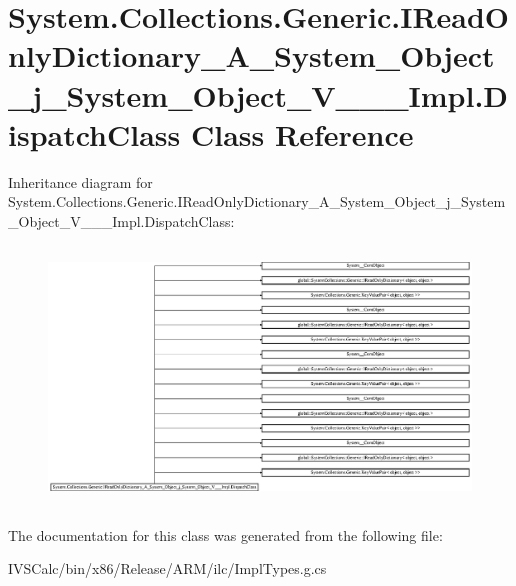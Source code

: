 \hypertarget{class_system_1_1_collections_1_1_generic_1_1_i_read_only_dictionary___a___system___object__j___s1aae0a57dbf34cb01a493fd2e37dd17e}{}\section{System.\+Collections.\+Generic.\+I\+Read\+Only\+Dictionary\+\_\+\+A\+\_\+\+System\+\_\+\+Object\+\_\+j\+\_\+\+System\+\_\+\+Object\+\_\+\+V\+\_\+\+\_\+\+\_\+\+Impl.\+Dispatch\+Class Class Reference}
\label{class_system_1_1_collections_1_1_generic_1_1_i_read_only_dictionary___a___system___object__j___s1aae0a57dbf34cb01a493fd2e37dd17e}
Inheritance diagram for System.\+Collections.\+Generic.\+I\+Read\+Only\+Dictionary\+\_\+\+A\+\_\+\+System\+\_\+\+Object\+\_\+j\+\_\+\+System\+\_\+\+Object\+\_\+\+V\+\_\+\+\_\+\+\_\+\+Impl.\+Dispatch\+Class\+:\begin{figure}[H]
\begin{center}
\leavevmode
\includegraphics[height=6.924266cm]{class_system_1_1_collections_1_1_generic_1_1_i_read_only_dictionary___a___system___object__j___s1aae0a57dbf34cb01a493fd2e37dd17e}
\end{center}
\end{figure}


The documentation for this class was generated from the following file\+:\begin{DoxyCompactItemize}
\item 
I\+V\+S\+Calc/bin/x86/\+Release/\+A\+R\+M/ilc/Impl\+Types.\+g.\+cs\end{DoxyCompactItemize}
